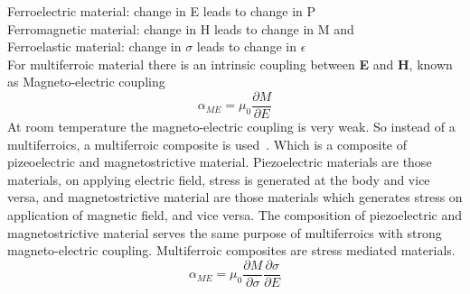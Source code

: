 \documentclass[12pt,a4paper,bold]{thesis}
\theoremstyle{thm}
\theoremstyle{definition}
\begin{document}
Ferroelectric material: change in E leads to change in P\\
Ferromagnetic material: change in H leads to change in M and\\
Ferroelastic material: change in $\sigma$ leads to change in $\epsilon$\\
For multiferroic material there is an intrinsic coupling between \textbf{E} and \textbf{H}, known as Magneto-electric coupling
\[\alpha_{ME}=\mu_0\frac{\partial M}{\partial E}\]
At room temperature the magneto-electric coupling is very weak. So instead of a multiferroics, a multiferroic composite is used~\cite{RefWorks:842}. Which is a composite of pizeoelectric and magnetostrictive material. Piezoelectric materials are those materials, on applying electric field, stress is generated at the body and vice versa, and magnetostrictive material are those materials which generates stress on application of magnetic field, and vice versa. The composition of piezoelectric and magnetostrictive material serves the same purpose of multiferroics with strong magneto-electric coupling. Multiferroic composites are stress mediated materials.~\cite{RefWorks:164}
\[\alpha_{ME}=\mu_0\frac{\partial M}{\partial \sigma}\frac{\partial \sigma}{\partial E}\] 
\end{document}
